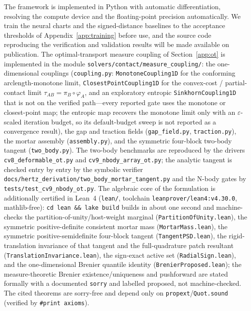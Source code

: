 \documentclass{svjour3}                 %
\newcommand{\tmap}{\tau_{AB}}
\newcommand{\map}[1]{\varphi_{#1}}
\newcommand{\code}[1]{\texttt{#1}}
\begin{document}
\begin{appendix}
The framework is implemented in Python with automatic differentiation, resolving the compute device and the
floating-point precision automatically. We train the neural charts and the signed-distance baselines to the
acceptance thresholds of Appendix~\ref{app:training} before use, and the source code reproducing the verification
and validation results will be made available on publication. The optimal-transport measure coupling of
Section~\ref{app:ot} is implemented in the module \code{solvers/contact/measure\_coupling/}: the one-dimensional
couplings (\code{coupling.py}: \code{MonotoneCoupling1D} for the conforming arclength-monotone limit,
\code{ClosestPointCoupling1D} for the convex-cost / partial-contact limit $\tmap=\pi_B\circ\map{A}$, and an
exploratory entropic \code{SinkhornCoupling1D} that is not on the verified path---every reported gate uses the
monotone or closest-point map; the entropic map recovers the monotone limit only with an $\varepsilon$-scaled
iteration budget, so its default-budget sweep is not reported as a convergence result), the gap and traction
fields (\code{gap\_field.py}, \code{traction.py}), the
mortar assembly (\code{assembly.py}), and the symmetric four-block two-body tangent (\code{two\_body.py}). The
two-body benchmarks are reproduced by the drivers \code{cv8\_deformable\_ot.py} and \code{cv9\_nbody\_array\_ot.py};
the analytic tangent is checked entry by entry by the symbolic verifier
\code{docs/hertz\_derivation/two\_body\_mortar\_tangent.py} and the N-body gates by \code{tests/test\_cv9\_nbody\_ot.py}.
The algebraic core of the formulation is additionally certified in Lean~4 (\code{lean/}, toolchain
\code{leanprover/lean4:v4.30.0}, mathlib-free): \code{cd lean \&\& lake build} builds in about one second and
machine-checks the partition-of-unity/host-weight marginal (\code{PartitionOfUnity.lean}), the symmetric
positive-definite consistent mortar mass (\code{MortarMass.lean}), the symmetric positive-semidefinite four-block
tangent (\code{TangentPSD.lean}), the rigid-translation invariance of that tangent and the full-quadrature patch
resultant (\code{TranslationInvariance.lean}), the sign-exact active set (\code{RadialSign.lean}), and the
one-dimensional Brenier quantile identity (\code{BrenierProposed.lean}); the
measure-theoretic Brenier existence/uniqueness and pushforward are stated formally with a documented \code{sorry}
and labelled proposed, not machine-checked. The cited theorems are sorry-free and depend only on
\code{propext}/\code{Quot.sound} (verified by \code{\#print axioms}).


\end{appendix}
\end{document}
